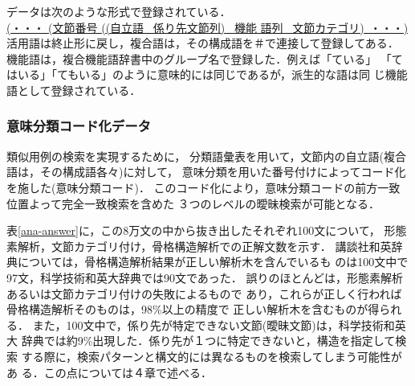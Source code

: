 データは次のような形式で登録されている．\\
\hspace*{5mm}\underline{(\hspace{-.2em}・\hspace{-.7em}・\hspace{-.7em}・\hspace{-.2em} (文節番号 ((自立語 \ 係り先文節列) \ 機能
語列 \ 文節カテゴリ)\ \hspace{-.2em}・\hspace{-.7em}・\hspace{-.7em}・\hspace{-.2em})} \\
活用語は終止形に戻し，複合語は，その構成語を＃で連接して登録してある．
機能語は，複合機能語辞書中のグループ名で登録した．例えば「ている」
「てはいる」「てもいる」のように意味的には同じであるが，派生的な語は同
じ機能語として登録されている．



\subsubsection{意味分類コード化データ}
類似用例の検索を実現するために，
分類語彙表\cite{bunrui}を用いて，文節内の自立語(複合語は，その構成語各々)に対して，
意味分類を用いた番号付けによってコード化を施した(意味分類コード)．
このコード化により，意味分類コードの前方一致位置よって完全一致検索を含めた
３つのレベルの曖昧検索が可能となる．


\vspace*{5mm} 
表\ref{ana-answer}に，この8万文の中から抜き出したそれぞれ100文について，
形態素解析，文節カテゴリ付け，骨格構造解析での正解文数を示す．
講談社和英辞典については，骨格構造解析結果が正しい解析木を含んでいるも
のは100文中で97文，科学技術和英大辞典では90文であった．
誤りのほとんどは，形態素解析あるいは文節カテゴリ付けの失敗によるもので
あり，これらが正しく行われば骨格構造解析そのものは，98\%以上の精度で
正しい解析木を含むものが得られる．
また，100文中で，係り先が特定できない文節(曖昧文節)は，科学技術和英大
辞典では約9\%出現した．係り先が１つに特定できないと，構造を指定して検索
する際に，検索パターンと構文的には異なるものを検索してしまう可能性があ
る．この点については４章で述べる．


